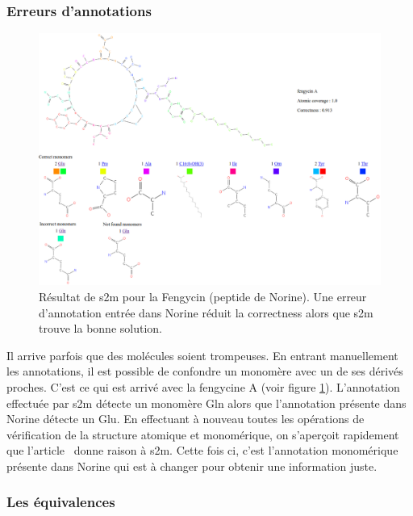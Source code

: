 \subsubsection{Erreurs d'annotations}

\begin{figure}[h!]
  \begin{center}
    \includegraphics[width=450px]{Figures/s2m/results/fengycin.png}
    \caption{\label{fengycin}Résultat de s2m pour la Fengycin (peptide de Norine).
    Une erreur d'annotation entrée dans Norine réduit la correctness alors que s2m trouve la bonne solution.}
  \end{center}
\end{figure}

Il arrive parfois que des molécules soient trompeuses.
En entrant manuellement les annotations, il est possible de confondre un monomère avec un de ses dérivés proches.
C'est ce qui est arrivé avec la fengycine A (voir figure \ref{fengycin}).
L'annotation effectuée par s2m détecte un monomère Gln alors que l'annotation présente dans Norine détecte un Glu.
En effectuant à nouveau toutes les opérations de vérification de la structure atomique et monomérique, on s'aperçoit rapidement que l'article~\cite{wu_nonribosomal_2007} donne raison à s2m.
Cette fois ci, c'est l'annotation monomérique présente dans Norine qui est à changer pour obtenir une information juste.


\subsubsection{Les équivalences}

